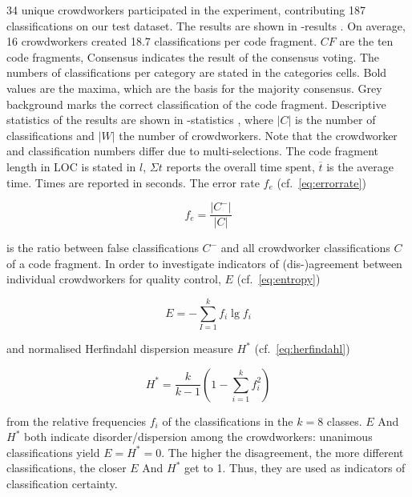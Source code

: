 34 unique crowdworkers participated in the experiment, contributing 187 classifications on our test dataset.
The results are shown in -results \autocite{Heil2019CSRECCIS}.
On average, 16 crowdworkers created 18.7 classifications per code fragment.
\(CF\) are the ten code fragments, Consensus indicates the result of the consensus voting.
The numbers of classifications per category are stated in the categories cells.
Bold values are the maxima, which are the basis for the majority consensus.
Grey background marks the correct classification of the code fragment.
Descriptive statistics of the results are shown in -statistics \autocite{Heil2019CSRECCIS}, where \(|C|\) is the number of classifications and \(|W|\) the number of crowdworkers.
Note that the crowdworker and classification numbers differ due to multi-selections.
The code fragment length in LOC is stated in \(l\), \(\Sigma t\) reports the overall time spent, \(\overline t\) is the average time.
Times are reported in seconds.
The error rate \(f_e\) (cf.~\cref{eq:errorrate})

\begin{equation}f_e = \frac{|C^-|}{|C|}\label{eq:errorrate}\end{equation}

is the ratio between false classifications \(C^-\) and all crowdworker classifications \(C\) of a code fragment.
In order to investigate indicators of (dis-)agreement between individual crowdworkers for quality control, \(E\) (cf.~\cref{eq:entropy})

\begin{equation}E = - \sum\limits^k_{I=1}f_i \lg f_i\label{eq:entropy}\end{equation}

and normalised Herfindahl dispersion measure \(H^*\) (cf.~\cref{eq:herfindahl})

\begin{equation}H^*=\frac{k}{k-1}\left(1-\sum\limits_{i=1}^{k}f_i^2\right)\label{eq:herfindahl}\end{equation}

from the relative frequencies \(f_i\) of the classifications in the \(k=8\) classes.
\(E\) And \(H^*\) both indicate disorder/dispersion among the crowdworkers: unanimous classifications yield \(E=H^*=0\).
The higher the disagreement, the more different classifications, the closer \(E\) And \(H^*\) get to 1.
Thus, they are used as indicators of classification certainty.

